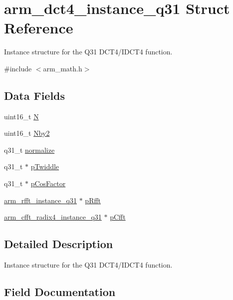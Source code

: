 \hypertarget{structarm__dct4__instance__q31}{}\section{arm\+\_\+dct4\+\_\+instance\+\_\+q31 Struct Reference}
\label{structarm__dct4__instance__q31}


Instance structure for the Q31 D\+C\+T4/\+I\+D\+C\+T4 function.  




{\ttfamily \#include $<$arm\+\_\+math.\+h$>$}

\subsection*{Data Fields}
\begin{DoxyCompactItemize}
\item 
uint16\+\_\+t \mbox{\hyperlink{structarm__dct4__instance__q31_a37d49571fe35012087153c093705cd11}{N}}
\item 
uint16\+\_\+t \mbox{\hyperlink{structarm__dct4__instance__q31_afa64b1618089e35c2b55cff71cb29715}{Nby2}}
\item 
q31\+\_\+t \mbox{\hyperlink{structarm__dct4__instance__q31_a3a2f571658a202a38fa508098001b47c}{normalize}}
\item 
q31\+\_\+t $\ast$ \mbox{\hyperlink{structarm__dct4__instance__q31_a2505b7d5ec077b244c712797a5253b6d}{p\+Twiddle}}
\item 
q31\+\_\+t $\ast$ \mbox{\hyperlink{structarm__dct4__instance__q31_af06acf18dc6547fc29aba2eb68cc63f0}{p\+Cos\+Factor}}
\item 
\mbox{\hyperlink{structarm__rfft__instance__q31}{arm\+\_\+rfft\+\_\+instance\+\_\+q31}} $\ast$ \mbox{\hyperlink{structarm__dct4__instance__q31_a16c74f8496e1691e62da3c57e0c676eb}{p\+Rfft}}
\item 
\mbox{\hyperlink{structarm__cfft__radix4__instance__q31}{arm\+\_\+cfft\+\_\+radix4\+\_\+instance\+\_\+q31}} $\ast$ \mbox{\hyperlink{structarm__dct4__instance__q31_a0b1f4a05c1824bab3b9bd837a260232a}{p\+Cfft}}
\end{DoxyCompactItemize}


\subsection{Detailed Description}
Instance structure for the Q31 D\+C\+T4/\+I\+D\+C\+T4 function. 

\subsection{Field Documentation}
\mbox{\label{structarm__dct4__instance__q31_a37d49571fe35012087153c093705cd11}} 
